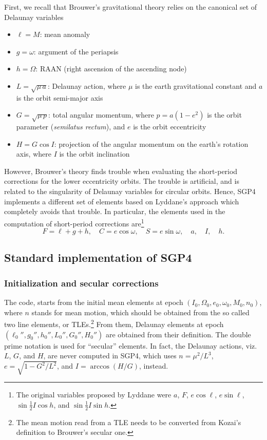 \documentclass{article}
\begin{document}
First, we recall that Brouwer's gravitational theory relies on the canonical set of Delaunay variables
\begin{itemize} \itemsep0em
\item $\ell=M$: mean anomaly
\item $g=\omega$: argument of the periapsis
\item $h=\Omega$: RAAN (right ascension of the ascending node)
\item $L=\sqrt{\mu\,a}$: Delaunay action, where $\mu$ is the earth gravitational constant and $a$ is the orbit semi-major axis
\item $G=\sqrt{\mu\,p}$: total angular momentum, where $p=a(1-e^2)$ is the orbit parameter (\textit{semilatus rectum}), and $e$ is the orbit eccentricity
\item $H=G\cos{I}$: projection of the angular momentum on the earth's rotation axis, where $I$ is the orbit inclination
\end{itemize}
However, Brouwer's theory finds trouble when evaluating the short-period corrections for the lower eccentricity orbits. The trouble is artificial, and is related to the singularity of Delaunay variables for circular orbits. Hence,
SGP4 implements a different set of elements based on Lyddane's approach which completely avoids that trouble. In particular, the elements used in the computation of short-period corrections are\footnote{The original variables proposed by Lyddane were $a$, $F$, $e\cos\ell$, $e\sin\ell$, $\sin\frac{1}{2}I\cos{h}$, and $\sin\frac{1}{2}I\sin{h}$. }
\[
F=\ell+g+h, \quad C=e\cos\omega, \quad S=e\sin\omega, \quad a, \quad I, \quad h.
\]

\subsection{Standard implementation of SGP4} \label{sec:vallado}

\subsubsection{Initialization and secular corrections}
The code, starts from the initial mean elements at epoch $(I_0,\Omega_0,e_0,\omega_0,M_0,n_0)$, where $n$ stands for mean motion, which should be obtained from the so called two line elements, or TLEs.\footnote{The mean motion read from a TLE needs to be converted from Kozai's definition to Brouwer's secular one.} From them, Delaunay elements at epoch $(\ell_0'',g_0'', h_0'',L_0'',G_0'',H_0'')$ are obtained from their definition. The double prime notation is used for ``secular'' elements. In fact, the Delaunay actions, viz.~$L$, $G$, and $H$, are never computed in SGP4, which uses $n=\mu^2/L^3$, $e=\sqrt{1-G^2/L^2}$, and $I=\arccos(H/G)$, instead.
\end{document}
